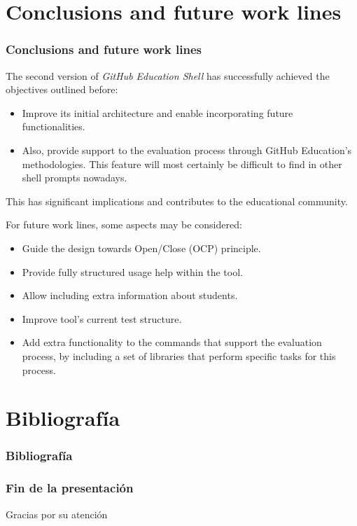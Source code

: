 \documentclass{beamer}
\begin{document}
\section{Conclusions and future work lines}
\begin{frame}[allowframebreaks]
  \frametitle{Conclusions and future work lines}
  The second version of {\it GitHub Education Shell} has successfully achieved the objectives outlined before:
  \begin{itemize}
    \item  Improve its initial architecture and enable incorporating future functionalities.
    \item  Also, provide support to the evaluation process through GitHub Education’s methodologies. This feature will most certainly be difficult to find in other shell prompts nowadays.
  \end{itemize}
  This has significant implications and contributes to the educational community.

  \framebreak

  For future work lines, some aspects may be considered:
  \begin{itemize}
    \item Guide the design towards Open/Close (OCP) principle.
    \item Provide fully structured usage help within the tool.
    \item Allow including extra information about students.
    \item Improve tool's current test structure.
    \item Add extra functionality to the commands that support the evaluation process, by including a set of libraries
    that perform specific tasks for this process.
  \end{itemize}
\end{frame}


\section{Bibliografía}
\begin{frame}[allowframebreaks]
  \frametitle{Bibliografía}
  
  
  \nocite{*}
\end{frame}

\begin{frame}
  \frametitle{Fin de la presentación}
  \begin{center}
    \Huge{Gracias por su atención}
  \end{center}
\end{frame}
\end{document}
